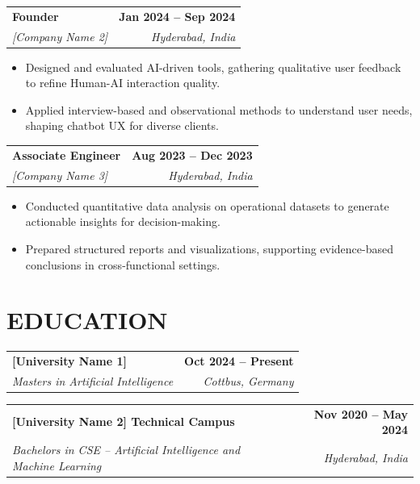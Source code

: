 \documentclass[a4paper,11pt]{article}
\makeatletter
\newcommand{\entryheader}[4]{%
  \begin{tabularx}{\textwidth}{@{}>{\RaggedRight\arraybackslash}X r@{}}
    \textbf{#1} & \textbf{#2} \\
    \textit{#3} & \textit{#4} \\
  \end{tabularx}%
}
\newenvironment{entrybullets}{%
  \begin{minipage}[t]{0.77\textwidth}
    \begin{itemize}[leftmargin=*,label=\textbullet,align=left]
}{%
    \end{itemize}
  \end{minipage}
}
\makeatother
\begin{document}
\vspace{0.25cm}
\entryheader{Founder}{Jan 2024 -- Sep 2024}{[Company Name 2]}{Hyderabad, India}
\begin{entrybullets}
  \item Designed and evaluated AI-driven tools, gathering qualitative user feedback to refine Human-AI interaction quality.
  \item Applied interview-based and observational methods to understand user needs, shaping chatbot UX for diverse clients.
\end{entrybullets}

\vspace{0.25cm}
\entryheader{Associate Engineer}{Aug 2023 -- Dec 2023}{[Company Name 3]}{Hyderabad, India}
\begin{entrybullets}
  \item Conducted quantitative data analysis on operational datasets to generate actionable insights for decision-making.
  \item Prepared structured reports and visualizations, supporting evidence-based conclusions in cross-functional settings.
\end{entrybullets}

\section*{EDUCATION}
\begin{tabularx}{\textwidth}{@{}X r@{}}
  \textbf{[University Name 1]} & \textbf{Oct 2024 -- Present} \\
  \textit{Masters in Artificial Intelligence} & \textit{Cottbus, Germany} \\
\end{tabularx}

\vspace{0.25cm}
\begin{tabularx}{\textwidth}{@{}X r@{}}
  \textbf{[University Name 2] Technical Campus} & \textbf{Nov 2020 -- May 2024} \\
  \textit{Bachelors in CSE -- Artificial Intelligence and Machine Learning} & \textit{Hyderabad, India} \\
\end{tabularx}

\end{document}

